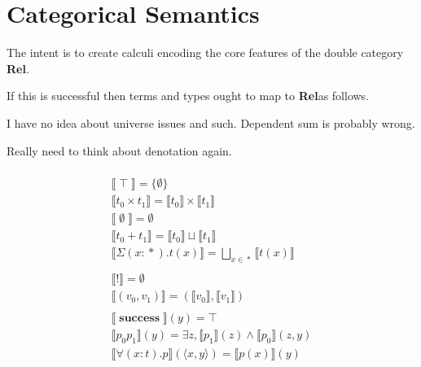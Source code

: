 \documentclass[twocolumn]{scrartcl}
\newcommand{\Rel}{\textbf{Rel}}
\newcommand{\sat}{\mathbin{\otimes}}
\DeclareMathOperator{\unit}{\top}
\DeclareMathOperator{\mt}{\emptyset}
\DeclareMathOperator{\coin}{\textbf{!}}
\DeclareMathOperator{\success}{\textbf{success}}
\DeclareMathOperator{\prop}{*}
\begin{document}
\section*{Categorical Semantics}

The intent is to create calculi encoding the core features of the
double category \Rel.

If this is successful then terms and types ought to map to \Rel as
follows.

\begin{center}
\end{center}

I have no idea about universe issues and such. Dependent sum is probably wrong.

Really need to think about denotation again.

\begin{multline*}
  \\
  \llbracket \unit \rrbracket = \{ \emptyset \} \\
  \llbracket t_0 \times t_1 \rrbracket = \llbracket t_0 \rrbracket \times \llbracket t_1 \rrbracket \\
  \llbracket \mt \rrbracket = \emptyset \\
  \llbracket t_0 + t_1 \rrbracket = \llbracket t_0 \rrbracket \sqcup \llbracket t_1 \rrbracket \\
  \llbracket \Sigma (x \colon \prop). t(x) \rrbracket = \bigsqcup_{ x \in \prop} \llbracket t(x) \rrbracket \\
  \\
  \llbracket \coin \rrbracket = \emptyset \\
  \llbracket ( v_0 , v_1 ) \rrbracket = ( \llbracket v_0 \rrbracket , \llbracket v_1 \rrbracket ) \\
  \\
  \llbracket \success \rrbracket(y) = \top \\
  \llbracket p_0 p_1 \rrbracket(y) = \exists z,  \llbracket p_1 \rrbracket (z) \wedge \llbracket p_0 \rrbracket (z, y)\\
  \llbracket \forall (x \colon t). p \rrbracket(\langle x, y \rangle) = \llbracket p(x) \rrbracket (y)  \\
\end{multline*}
\end{document}
